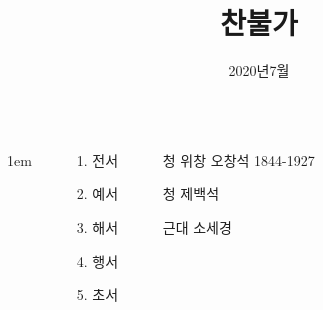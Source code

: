 \documentclass[	25pt, 
							a0paper, 
							landscape, %
							margin=0mm, %
							innermargin=10mm,  		%
							colspace=5mm, 
							subcolspace=0mm
							]{tikzposter}
\title{ 찬불가 }
\author{ 2020년7월 }
\begin{document}
	\maketitle[
					width=841mm,
					linewidth = 2mm,
					innersep=4mm,
					titletextscale =4, 
				]




	\begin{columns}


			{
					\setlength{\leftmargini}{7em}
					\setlength{\labelsep} {1em}
				\begin{LARGE}
					\begin{itemize}
					\item [1.] 전서
					\item [2.] 예서
					\item [3.] 해서
					\item [4.] 행서
					\item [5.] 초서
					\end{itemize}
				\end{LARGE}
			}


		{
			\setlength{\leftmargini}{4em}			
			\setlength{\labelsep}{1em} %

			\begin{LARGE}
			\begin{itemize}
			\item [청] 위창 오창석 1844-1927
			\item [청] 제백석
			\item [근대] 소세경
			\end{itemize}
			\end{LARGE}

		}

		{
			\setlength{\leftmargini}{7em}			
			\setlength{\labelsep}{1em} %

}
\end{columns}
\end{document}
